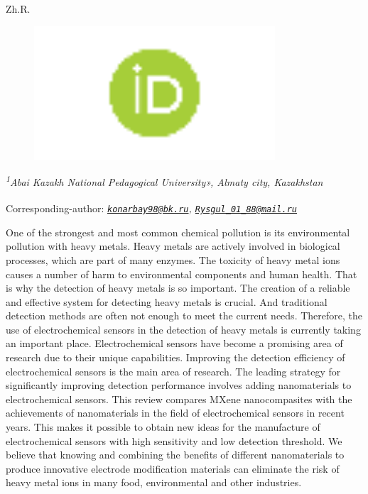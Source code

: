 {Zh.R.
\begin{figure}[H]
	\centering
	\includegraphics[width=0.8\textwidth]{media/chem2/image11}
	\caption*{}
\end{figure}


\emph{\textsuperscript{1}Abai Kazakh National Pedagogical University»,
Almaty city, Kazakhstan}

\textsuperscript{\envelope }Corresponding-author:
\emph{\href{mailto:konarbay98@bk.ru}{\nolinkurl{konarbay98@bk.ru}},
\href{mailto:Rysgul_01_88@mail.ru}{\nolinkurl{Rysgul\_01\_88@mail.ru}}}

One of the strongest and most common chemical pollution is its
environmental pollution with heavy metals. Heavy metals are actively
involved in biological processes, which are part of many enzymes. The
toxicity of heavy metal ions causes a number of harm to environmental
components and human health. That is why the detection of heavy metals
is so important. The creation of a reliable and effective system for
detecting heavy metals is crucial. And traditional detection methods are
often not enough to meet the current needs. Therefore, the use of
electrochemical sensors in the detection of heavy metals is currently
taking an important place. Electrochemical sensors have become a
promising area of research due to their unique capabilities. Improving
the detection efficiency of electrochemical sensors is the main area of
research. The leading strategy for significantly improving detection
performance involves adding nanomaterials to electrochemical sensors.
This review compares MXene nanocompasites with the achievements of
nanomaterials in the field of electrochemical sensors in recent years.
This makes it possible to obtain new ideas for the manufacture of
electrochemical sensors with high sensitivity and low detection
threshold. We believe that knowing and combining the benefits of
different nanomaterials to produce innovative electrode modification
materials can eliminate the risk of heavy metal ions in many food,
environmental and other industries.

}
